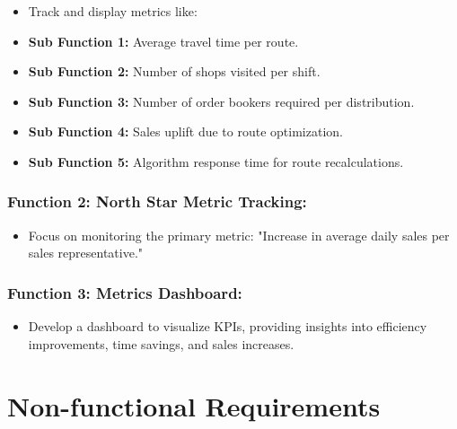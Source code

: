 \begin{itemize}
    \item Track and display metrics like:
\end{itemize}
    \begin{itemize}
    \item[] \textbf{Sub Function 1:} Average travel time per route.
    \item[] \textbf{Sub Function 2:} Number of shops visited per shift.
    \item[] \textbf{Sub Function 3:} Number of order bookers required per distribution.
    \item[] \textbf{Sub Function 4:} Sales uplift due to route optimization.
    \item[] \textbf{Sub Function 5:} Algorithm response time for route recalculations.
\end{itemize}
 

\subsubsection*{Function 2: North Star Metric Tracking: 
}

\begin{itemize}
    \item Focus on monitoring the primary metric: "Increase in average daily sales per sales representative."
\end{itemize}

\subsubsection*{Function 3: Metrics Dashboard:
}

\begin{itemize}
    \item Develop a dashboard to visualize KPIs, providing insights into efficiency improvements, time savings, and sales increases.
\end{itemize}










\section{Non-functional Requirements}

